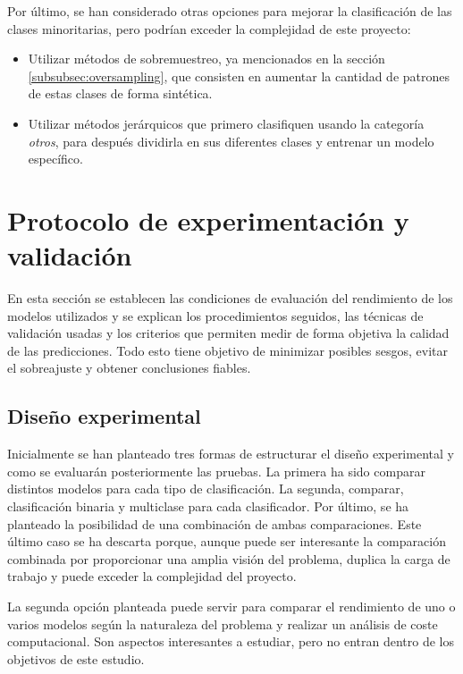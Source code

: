 Por último, se han considerado otras opciones para mejorar la clasificación de las clases minoritarias, pero podrían exceder la complejidad de este proyecto:

\begin{itemize}
	\item Utilizar métodos de sobremuestreo, ya mencionados en la sección \ref{subsubsec:oversampling}, que consisten en aumentar la cantidad de patrones de estas clases de forma sintética.
	\item Utilizar métodos jerárquicos que primero clasifiquen usando la categoría \textit{otros}, para después dividirla en sus diferentes clases y entrenar un modelo específico.
\end{itemize}

\section{Protocolo de experimentación y validación}
\label{sec:protocolo_exper}

En esta sección se establecen las condiciones de evaluación del rendimiento de los modelos utilizados y se explican los procedimientos seguidos, las técnicas de validación usadas y los criterios que permiten medir de forma objetiva la calidad de las predicciones. Todo esto tiene objetivo de minimizar posibles sesgos, evitar el sobreajuste y obtener conclusiones fiables.

\subsection{Diseño experimental}
\label{subsec:diseño}

Inicialmente se han planteado tres formas de estructurar el diseño experimental y como se evaluarán posteriormente las pruebas. La primera ha sido comparar distintos modelos para cada tipo de clasificación. La segunda, comparar, clasificación binaria y multiclase para cada clasificador. Por último, se ha planteado la posibilidad de una combinación de ambas comparaciones. Este último caso se ha descarta porque, aunque puede ser interesante la comparación combinada por proporcionar una amplia visión del problema, duplica la carga de trabajo y puede exceder la complejidad del proyecto.

\vspace{1em}

La segunda opción planteada puede servir para comparar el rendimiento de uno o varios modelos según la naturaleza del problema y realizar un análisis de coste computacional. Son aspectos interesantes a estudiar, pero no entran dentro de los objetivos de este estudio.

